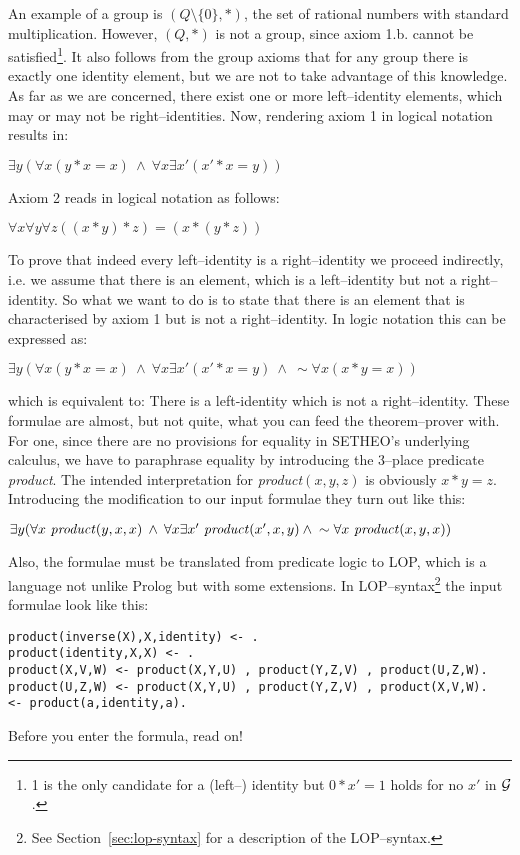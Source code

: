 An example of a group is $(Q\setminus \{0\},*)$, the set of rational numbers with
standard multiplication. However, $(Q,*)$ is not a group, since axiom 1.b. cannot
be satisfied\footnote{1 is the only candidate for a (left--) identity but
$0 * x' = 1$ holds for no $x'$ in $\cal G$.}.
It also follows from the group axioms that  for any group there is exactly
one identity element, but we are not to take advantage of this knowledge.
As far as we are concerned, there
exist one or more left--identity elements, which may or may not be right--identities.
Now, rendering axiom 1 in logical notation results in:
\begin{center}
	$\exists y (\forall x  (y * x = x) \:\wedge\: \forall x  \exists x' (x' * x = y))$
\end{center} 
Axiom 2 reads in logical notation as follows:
\begin{center}
	$\forall x \forall y \forall z  ((x * y) * z) = (x * (y * z))$
\end{center} 
To prove that indeed every left--identity is a right--identity we proceed
indirectly, i.e. we assume that there is an element, which is a left--identity 
but not a right--identity.
So what we want to do is to state that there is an element that is characterised by axiom 1
but is not a right--identity.
In logic notation this can be expressed as:
\begin{center}
	$\exists y (\forall x  (y * x = x) \:\wedge\: \forall x  \exists x' (x' * x = y) \:\wedge\:  \sim \forall x  (x * y = x))$
\end{center} 
which is equivalent to: There is a left-identity which is not a right--identity.
These formulae are almost, but not quite, what you can feed the theorem--prover with.
For one, since there are no provisions for equality in SETHEO's underlying calculus,
we have to paraphrase equality by introducing the 3--place predicate
{\it product\/}. The intended
interpretation for {\it product\/}$(x,y,z)$ is obviously $x * y = z$. 
Introducing the modification to our input formulae they
turn out like this:
\begin{center}
$\exists y (\forall x  \mbox{ {\it product\/}}(y,x,x) \:\wedge\: \forall x
\exists x' \mbox{ {\it product\/}}(x',x,y) \:\wedge\:  \sim \forall x
\mbox{ {\it product\/}}(x,y,x))$
\end{center} 
Also, the formulae must be translated from predicate logic to LOP,
which is a language not unlike Prolog but with some extensions. In
LOP--syntax\footnote{See Section~\ref{sec:lop-syntax} for a description of
the LOP--syntax.} the input formulae look like this:
\begin{center}
\begin{verbatim}
product(inverse(X),X,identity) <- .
product(identity,X,X) <- .
product(X,V,W) <- product(X,Y,U) , product(Y,Z,V) , product(U,Z,W).
product(U,Z,W) <- product(X,Y,U) , product(Y,Z,V) , product(X,V,W).
<- product(a,identity,a).
\end{verbatim}
\end{center}
Before you enter the formula, read on!



